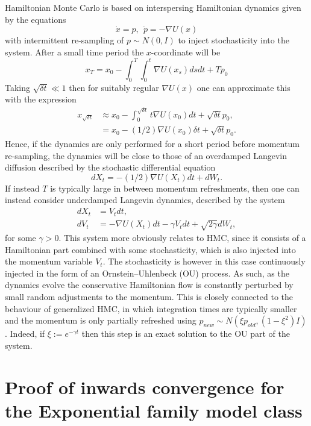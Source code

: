 \documentclass[bj,numbers,noshowframe]{imsart}
\theoremstyle{definition}
\theoremstyle{plain}
\theoremstyle{definition}
\begin{document}
Hamiltonian Monte Carlo is based on interspersing Hamiltonian dynamics given by the equations
\[
\dot{x} = p, ~~ \dot{p} = -\nabla U(x)
\]
with intermittent re-sampling of $p \sim N(0,I)$ to inject stochasticity into the system. After a small time period the $x$-coordinate will be
\[
x_T = x_0 - \int_0^T\int_0^t \nabla U(x_s)dsdt  + Tp_0
\]
Taking $\sqrt{\delta t} \ll 1$ then for suitably regular $\nabla U(x)$ one can approximate this with the expression
\begin{align*}
x_{\sqrt{\delta t}} &\approx x_0 - \int_0^{\sqrt{\delta t}} t\nabla U(x_0) dt  + \sqrt{\delta t} p_0, \\
&= x_0 - (1/2)\nabla U(x_0)\delta t  + \sqrt{\delta t}p_0.
\end{align*}
Hence, if the dynamics are only performed for a short period before momentum re-sampling, the dynamics will be close to those of an overdamped Langevin diffusion described by the stochastic differential equation
\[
dX_t = -(1/2)\nabla U(X_t)dt + dW_t.
\]
If instead $T$ is typically large in between momentum refreshments, then one can instead consider underdamped Langevin dynamics, described by the system
\begin{align*}
dX_t &= V_t dt, \\
dV_t &= -\nabla U(X_t)dt - \gamma V_t dt + \sqrt{2\gamma}dW_t,
\end{align*}
for some $\gamma>0$. This system more obviously relates to HMC, since it consists of a Hamiltonian part combined with some stochasticity, which is also injected into the momentum variable $V_t$. The stochasticity is however in this case continuously injected in the form of an Ornstein--Uhlenbeck (OU) process. As such, as the dynamics evolve the conservative Hamiltonian flow is constantly perturbed by small random adjustments to the momentum. This is closely connected to the behaviour of generalized HMC, in which integration times are typically smaller and the momentum is only partially refreshed using $p_{new} \sim N(\xi p_{old}, (1-\xi^2)I)$. Indeed, if $\xi := e^{-\gamma t}$ then this step is an exact solution to the OU part of the system.



\section{Proof of inwards convergence for the Exponential family model class}
\end{document}
